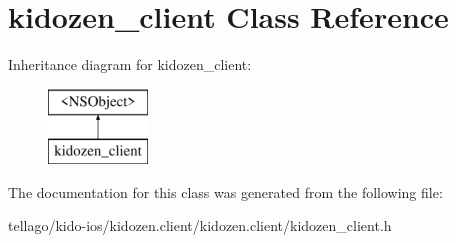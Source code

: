 \hypertarget{interfacekidozen__client}{\section{kidozen\-\_\-client Class Reference}
\label{interfacekidozen__client}
}
Inheritance diagram for kidozen\-\_\-client\-:\begin{figure}[H]
\begin{center}
\leavevmode
\includegraphics[height=2.000000cm]{interfacekidozen__client}
\end{center}
\end{figure}


The documentation for this class was generated from the following file\-:\begin{DoxyCompactItemize}
\item 
tellago/kido-\/ios/kidozen.\-client/kidozen.\-client/kidozen\-\_\-client.\-h\end{DoxyCompactItemize}
